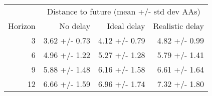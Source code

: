 
\begin{tabular*}{0.7\textwidth}{rrrr}
\toprule
          & \multicolumn{3}{c}{Distance to future (mean +/- std dev AAs)} \\
  Horizon & No delay & Ideal delay & Realistic delay \\
\midrule

3 & 3.62 +/- 0.73 & 4.12 +/- 0.79 & 4.82 +/- 0.99 \\
6 & 4.96 +/- 1.22 & 5.27 +/- 1.28 & 5.79 +/- 1.41 \\
9 & 5.88 +/- 1.48 & 6.16 +/- 1.58 & 6.61 +/- 1.64 \\
12 & 6.66 +/- 1.59 & 6.96 +/- 1.74 & 7.32 +/- 1.80 \\

\bottomrule
\end{tabular*}

